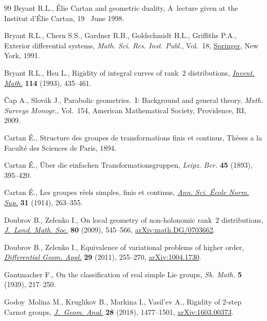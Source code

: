 \documentclass[pdftex]{sigma}
\numberwithin{equation}{section}
\theoremstyle{definition}
\newcommand{\0}{\boldsymbol{0}}
\begin{document}
\begin{thebibliography}{99}
Bryant R.L., \'Elie Cartan and geometric duality, {A}~lecture given at the
 Institut d'{\' E}lie Cartan, 19 ~June 1998.

Bryant R.L., Chern S.S., Gardner R.B., Goldschmidt H.L., Griffiths P.A.,
 Exterior differential systems, \textit{Math. Sci. Res. Inst. Publ.}, Vol.~18,
 \href{https://doi.org/10.1007/978-1-4613-9714-4}{Springer}, New York, 1991.

Bryant R.L., Hsu L., Rigidity of integral curves of rank~{$2$} distributions,
 \href{https://doi.org/10.1007/BF01232676}{\textit{Invent. Math.}}
 \textbf{114} (1993), 435--461.

{\v{C}}ap A., Slov\'ak J., Parabolic geometries.~{I}: Background and general
 theory, \textit{Math. Surveys Monogr.}, Vol.~154, American Mathematical
 Society, Providence, RI, 2009.

Cartan \'E., Structure des groupes de transformations finis et continus,
 {T}h\`eses a la Facult\'e des Sciences de Paris, 1894.

Cartan \'E., \"Uber die einfachen Transformationsgruppen, \textit{Leipz.
 Ber.} \textbf{45} (1893), 395--420.

Cartan \'E., Les groupes r\'eels simples, finis et continus,
 \href{https://doi.org/10.24033/asens.676}{\textit{Ann. Sci. \'Ecole Norm.
 Sup.}} \textbf{31} (1914), 263--355.

Doubrov B., Zelenko I., On local geometry of non-holonomic rank~$2$
 distributions, \href{https://doi.org/10.1112/jlms/jdp044}{\textit{J.~Lond.
 Math. Soc.}} \textbf{80} (2009), 545--566,
 \href{http://arxiv.org/abs/math.DG/0703662}{arXiv:math.DG/0703662}.

Doubrov B., Zelenko I., Equivalence of variational problems of higher order,
 \href{https://doi.org/10.1016/j.difgeo.2010.12.004}{\textit{Differential
 Geom. Appl.}} \textbf{29} (2011), 255--270,
 \href{http://arxiv.org/abs/1004.1730}{arXiv:1004.1730}.

Gantmacher F., On the classification of real simple {L}ie groups, \textit{Sb.
 Math.} \textbf{5} (1939), 217--250.

Godoy~Molina M., Kruglikov B., Markina I., Vasil'ev A., Rigidity of 2-step
 {C}arnot groups,
 \href{https://doi.org/10.1007/s12220-017-9875-3}{\textit{J.~Geom. Anal.}}
 \textbf{28} (2018), 1477--1501,
 \href{http://arxiv.org/abs/1603.00373}{arXiv:1603.00373}.


\end{thebibliography}
\end{document}
